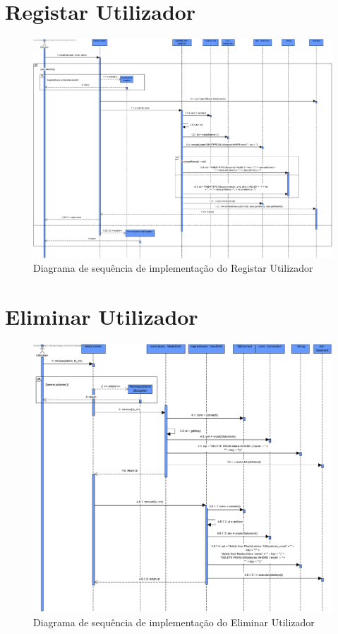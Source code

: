 \documentclass[a4paper]{report}
\begin{document}
\section{Registar Utilizador}

\begin{figure}[H]
	\centering 
    \includegraphics[width=\textwidth]{images/criarUserImp.png}  
    \caption{Diagrama de sequência de implementação do Registar Utilizador}
\end{figure}

\section{Eliminar Utilizador}

\begin{figure}[H]
	\centering 
    \includegraphics[width=\textwidth]{images/remUserImp.png}  
    \caption{Diagrama de sequência de implementação do Eliminar Utilizador}
\end{figure}
\end{document}
